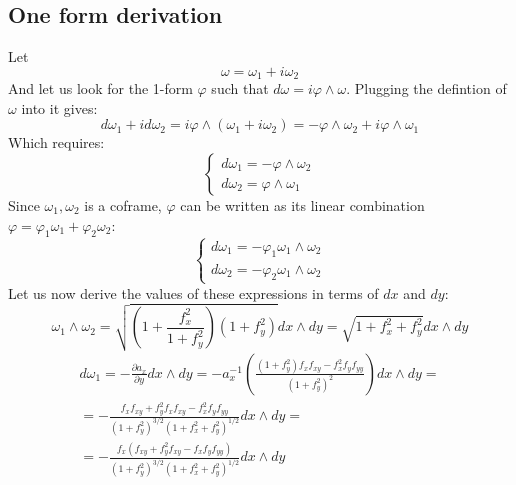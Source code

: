 \documentclass{article}
\begin{document}
\subsection*{One form derivation}
Let
\begin{equation}
    \omega = \omega_1 + i\omega_2
\end{equation}
And let us look for the 1-form $\varphi$ such that $d\omega = i\varphi \wedge \omega$. Plugging the defintion of $\omega$ into it gives:
\begin{equation}
    d\omega_1 + id\omega_2 = i \varphi \wedge (\omega_1 + i\omega_2) = -\varphi \wedge \omega_2 + i \varphi \wedge \omega_1
\end{equation}
Which requires:
\begin{equation}
\begin{cases}
    d\omega_1 = -\varphi \wedge \omega_2
    \\
    d\omega_2 = \varphi \wedge \omega_1
\end{cases}
\end{equation}
Since $\omega_1, \omega_2$ is a coframe, $\varphi$ can be written as its linear combination $\varphi = \varphi_1 \omega_1 + \varphi_2\omega_2$:
\begin{equation}
\begin{cases}
    d\omega_1 = -\varphi_1 \omega_1 \wedge \omega_2
    \\
    d\omega_2 = - \varphi_2 \omega_1 \wedge \omega_2
\end{cases}
\end{equation}
Let us now derive the values of these expressions in terms of $dx$ and $dy$:
\begin{equation}
    \omega_1 \wedge \omega_2 = \sqrt{\left(1 + \frac{f_x^2}{1 + f_y^2}\right)\left(1 + f_y^2\right)} dx \wedge dy = 
    \sqrt{1 + f_x^2 + f_y^2} dx \wedge dy
\end{equation}
\begin{equation}
\begin{gathered}
    d\omega_1 = -\frac{\partial a_x}{\partial y} dx \wedge dy =
    -a_x^{-1}\left(\frac{(1 + f_y^2)f_xf_{xy} - f_x^2f_yf_{yy}}{\left(1 + f_y^2\right)^2}\right) dx \wedge dy = \\ =
    -\frac{f_xf_{xy} + f_y^2f_xf_{xy} - f_x^2f_yf_{yy}}{\left(1 + f_y^2\right)^{3/2}\left(1 + f_x^2 + f_y^2\right)^{1/2}} dx \wedge dy = \\ =
    -\frac{f_x(f_{xy} + f_y^2f_{xy} - f_xf_yf_{yy})}{\left(1 + f_y^2\right)^{3/2}\left(1 + f_x^2 + f_y^2\right)^{1/2}} dx \wedge dy
\end{gathered}
\end{equation}
\end{document}
